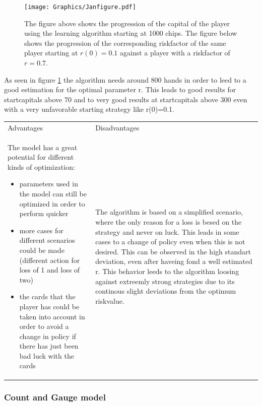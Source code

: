 \documentclass[11pt]{article}
\begin{document}
\begin{figure}[h!]
\centering
\texttt{[image: Graphics/Janfigure.pdf]}
\caption{The figure above shows the progression of the capital of the player using the learning algorithm starting at 1000 chips. The figure below shows the progression of the corresponding riskfactor of the same player starting at $r(0)=0.1$ against a player with a riskfactor of $r=0.7$.\label{Abbildung}}
\end{figure}

As seen in figure \ref{Abbildung} the algorithm needs around 800 hands in order to leed to a good estimation for the optimal parameter r. This leads to good results for startcapitals above 70 and to very good results at startcapitals above 300 even with a very unfavorable starting strategy like r(0)=0.1.
\\
\begin{tabular}{ p{7.2cm}  p{7.2cm}}
Advantages & Disadvantages\\
The model has a great potential for different kinds of optimization:
\begin{itemize}
\item parameters used in the model can still be optimized in order to perform quicker
\item more cases for different scenarios could be made (different action for loss of 1 and loss of two)
\item the cards that the player has could be taken into account in order to avoid a change in policy if there has just been bad luck with the cards 
\end{itemize}
 & The algorithm is based on a simplified scenario, where the only reason for a loss is besed on the strategy and never on luck. This leads in some cases to a change of policy even when this is not desired. This can be observed in the high standart deviation, even after haveing fond a well estimated r. This behavior leeds to the algorithm loosing against extreemly strong strategies due to its continous slight deviations from the optimum  riskvalue.\\ 
\end{tabular}

\subsubsection{Count and Gauge model}
\end{document}
